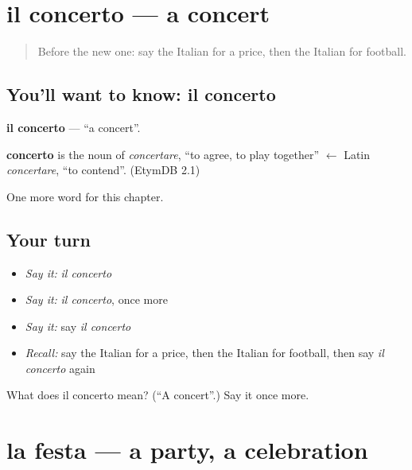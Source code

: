 \section[il concerto]{il concerto — a concert}

\label{lesson:IT-C117-concerto}



\begin{quote}
Before the new one: say the Italian for a price, then the Italian for football.
\end{quote}

\subsection*{You'll want to know: il concerto}
\textbf{il concerto} — \textquotedblleft{}a concert\textquotedblright{}.

\begin{cousinweb}
\textbf{concerto} is the noun of \emph{concertare}, \textquotedblleft{}to agree, to play together\textquotedblright{} $\leftarrow$ Latin \emph{concertare}, \textquotedblleft{}to contend\textquotedblright{}. (EtymDB 2.1)
\end{cousinweb}

\begin{grammarlens}[title={What you've built}]
One more word for this chapter.
\end{grammarlens}

\subsection*{Your turn}
\begin{itemize}
\raggedright
  \item \emph{Say it:} \emph{il concerto}
  \item \emph{Say it:} \emph{il concerto}, once more
  \item \emph{Say it:} say \emph{il concerto}
  \item \emph{Recall:} say the Italian for a price, then the Italian for football, then say \emph{il concerto} again
\end{itemize}

\begin{tcolorbox}[breakable,colback=teal!4,colframe=teal!35!black,title={Before you move on}]
What does il concerto mean? (\textquotedblleft{}A concert\textquotedblright{}.) Say it once more.
\end{tcolorbox}
\section[la festa]{la festa — a party, a celebration}

